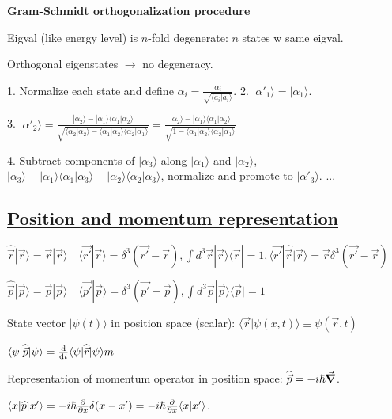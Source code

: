 \textbf{Gram-Schmidt orthogonalization procedure}

Eigval (like energy level) is $n$-fold degenerate: $n$ states w same eigval.

Orthogonal eigenstates $\rightarrow$ no degeneracy.

1. Normalize each state and define $\alpha_i = \frac{\alpha_i}{\sqrt{\langle a_i | a_i \rangle}}$. 2. $|\alpha'_1 \rangle = | \alpha_1 \rangle$.

3. $|\alpha'_2 \rangle = \frac{|\alpha_2 \rangle - |\alpha_1 \rangle \langle \alpha_1 | \alpha_2 \rangle}{\sqrt{\langle \alpha_2 | \alpha_2 \rangle - \langle \alpha_1 | \alpha_2 \rangle \langle \alpha_2 | \alpha_1 \rangle}} = \frac{|\alpha_2 \rangle - |\alpha_1 \rangle \langle \alpha_1 | \alpha_2 \rangle}{\sqrt{1 - \langle \alpha_1 | \alpha_2 \rangle \langle \alpha_2 | \alpha_1 \rangle}}$

4. Subtract components of $|\alpha_3 \rangle$ along $|\alpha_1 \rangle$ and $|\alpha_2 \rangle$, $|\alpha_3 \rangle - |\alpha_1 \rangle \langle \alpha_1 | \alpha_3 \rangle - | \alpha_2 \rangle \langle \alpha_2 | \alpha_3 \rangle$, normalize and promote to $|\alpha'_3 \rangle$.
...

\subsection{\underline{Position and momentum representation}}

$\widehat{\vec{r}} | \vec{r} \rangle = \vec{r} | \vec{r} \rangle \quad \langle \vec{r'} | \vec{r} \rangle = \delta^3 (\vec{r'} - \vec{r}), \int d^3 \vec{r} |\vec{r} \rangle \langle \vec{r} | = 1, \langle \vec{r'} | \hat{\vec{r}} | \vec{r} \rangle = \vec{r} \delta^3(\vec{r'} - \vec{r})$

$\widehat{\vec{p}} | \vec{p} \rangle = \vec{p} | \vec{p} \rangle \quad \langle \vec{p'} | \vec{p} \rangle = \delta^3(\vec{p'} - \vec{p}), \int d^3 \vec{p} | \vec{p} \rangle \langle \vec{p} | = 1$

State vector $| \psi(t) \rangle$ in position space (scalar): $\langle \vec{r} | \psi(x, t) \rangle \equiv \psi(\vec{r}, t)$

$\langle \psi | \widehat{\vec{p}} | \psi \rangle = \dv{}{t} \langle \psi | \widehat{\vec{r}} | \psi \rangle m$

Representation of momentum operator in position space: $\widehat{\vec{p}} = -i \hbar \vec{\grad}$.

$\langle x | \widehat{p} | x' \rangle = -i \hbar \pdv{}{x} \delta(x - x') = -i \hbar \pdv{}{x} \langle x | x' \rangle$.

